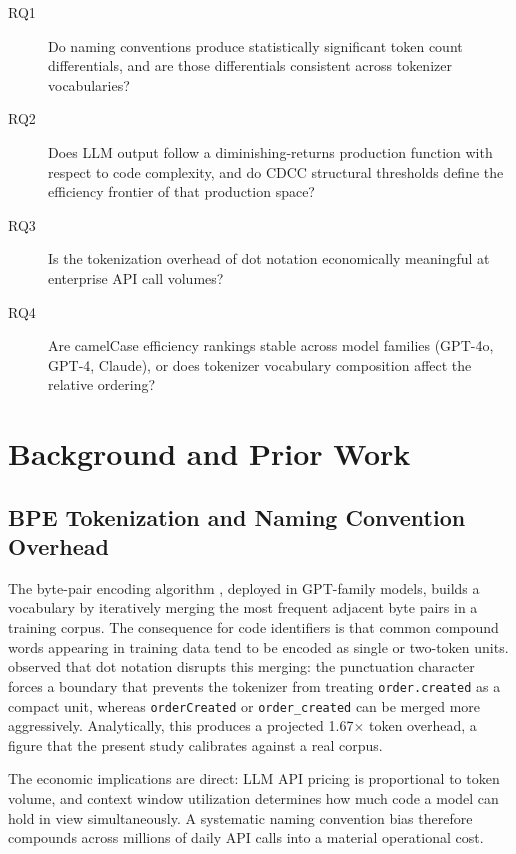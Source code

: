 \documentclass[11pt,a4paper]{article}
\begin{document}
\begin{description}
  \item[RQ1] Do naming conventions produce statistically significant token
    count differentials, and are those differentials consistent across
    tokenizer vocabularies?
  \item[RQ2] Does LLM output follow a diminishing-returns production function
    with respect to code complexity, and do CDCC structural thresholds define
    the efficiency frontier of that production space?
  \item[RQ3] Is the tokenization overhead of dot notation economically
    meaningful at enterprise API call volumes?
  \item[RQ4] Are camelCase efficiency rankings stable across model families
    (GPT-4o, GPT-4, Claude), or does tokenizer vocabulary composition affect
    the relative ordering?
\end{description}

\section{Background and Prior Work}

\subsection{BPE Tokenization and Naming Convention Overhead}

The byte-pair encoding algorithm \citep{sennrich2016}, deployed in GPT-family
models, builds a vocabulary by iteratively merging the most frequent adjacent
byte pairs in a training corpus. The consequence for code identifiers is that
common compound words appearing in training data tend to be encoded as single
or two-token units. \citet{pereira2026a} observed that dot notation disrupts
this merging: the punctuation character forces a boundary that prevents the
tokenizer from treating \texttt{order.created} as a compact unit, whereas
\texttt{orderCreated} or \texttt{order\_created} can be merged more
aggressively. Analytically, this produces a projected 1.67$\times$ token
overhead, a figure that the present study calibrates against a real corpus.

The economic implications are direct: LLM API pricing is proportional to
token volume, and context window utilization determines how much code a model
can hold in view simultaneously. A systematic naming convention bias therefore
compounds across millions of daily API calls into a material operational cost.
\end{document}
